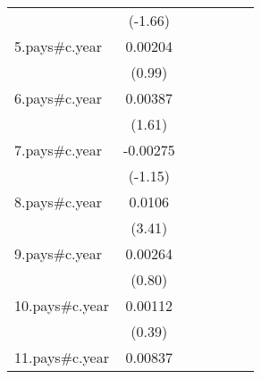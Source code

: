 {\begin{tabular}{l*{6}{c}}
                    &     (-1.66)         &                     &                     &                     &                     &                     \\
[1em]
5.pays#c.year       &     0.00204         &                     &                     &                     &                     &                     \\
                    &      (0.99)         &                     &                     &                     &                     &                     \\
[1em]
6.pays#c.year       &     0.00387         &                     &                     &                     &                     &                     \\
                    &      (1.61)         &                     &                     &                     &                     &                     \\
[1em]
7.pays#c.year       &    -0.00275         &                     &                     &                     &                     &                     \\
                    &     (-1.15)         &                     &                     &                     &                     &                     \\
[1em]
8.pays#c.year       &      0.0106\sym{***}&                     &                     &                     &                     &                     \\
                    &      (3.41)         &                     &                     &                     &                     &                     \\
[1em]
9.pays#c.year       &     0.00264         &                     &                     &                     &                     &                     \\
                    &      (0.80)         &                     &                     &                     &                     &                     \\
[1em]
10.pays#c.year      &     0.00112         &                     &                     &                     &                     &                     \\
                    &      (0.39)         &                     &                     &                     &                     &                     \\
[1em]
11.pays#c.year      &     0.00837\sym{**} &                     &                     &                     &                     &                     \\

\end{tabular}}
